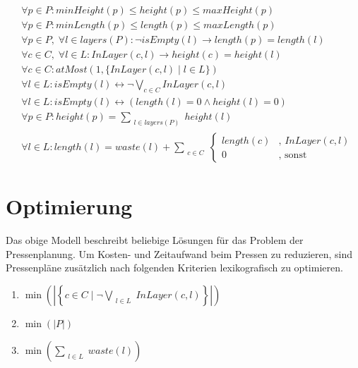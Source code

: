 \begin{align}
    & \forall p \in P: minHeight(p) \leq height(p) \leq maxHeight(p) \\[10pt]
    & \forall p \in P: minLength(p) \leq length(p) \leq maxLength(p) \\[10pt]
    & \forall p \in P,\; \forall l \in layers(P): \neg isEmpty(l) \rightarrow length(p) = length(l) \\[10pt]
    & \forall c \in C,\; \forall l \in L: InLayer(c,l) \rightarrow height(c) = height(l) \\[10pt]
    & \forall c \in C: atMost(1,\{ InLayer(c,l) \mid l \in L \}) \\[10pt]
    & \forall l \in L: isEmpty(l) \leftrightarrow \neg\bigvee_{c \in C} InLayer(c,l) \\[10pt]
    & \forall l \in L: isEmpty(l) \leftrightarrow (length(l) = 0 \land height(l) = 0) \\[10pt]
    & \forall p \in P: height(p) = \sum_{\substack{l \in layers(P)}} height(l)  \\[10pt]
    & \forall l \in L: length(l) = waste(l) + \sum_{\substack{c \in C}}
    \begin{cases}
        length(c) & \text{, } InLayer(c,l) \\
        0 & \text{, sonst}
    \end{cases}
\end{align}

\section{Optimierung}
Das obige Modell beschreibt beliebige Lösungen für das Problem der Pressenplanung.
Um Kosten- und Zeitaufwand beim Pressen zu reduzieren, sind Pressenpläne zusätzlich nach folgenden Kriterien lexikografisch zu optimieren.
\begin{enumerate}
    \item $ \min \left( \left\lvert \left\{ c \in C \mid \neg\bigvee\limits_{\substack{l \in L}} InLayer(c,l) \right\} \right\rvert \right) $
    \item $ \min (\lvert P \rvert) $
    \item $ \min \left(\sum\limits_{\substack{l \in L}} waste(l) \right) $
\end{enumerate}
